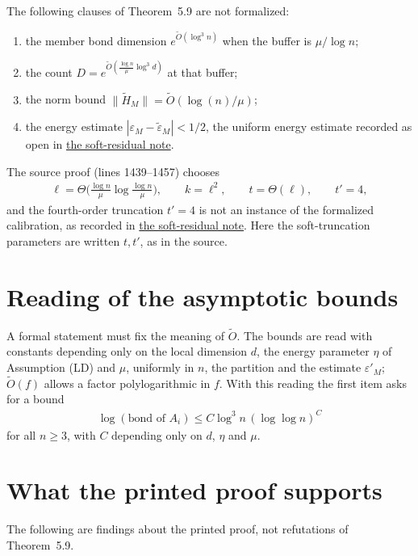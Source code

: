 \documentclass{article}
\begin{document}
The following clauses of Theorem~5.9 are not formalized:
\begin{enumerate}
 \item the member bond dimension $e^{\tilde O(\log^3 n)}$ when the buffer is
  $\mu/\log n$;
 \item the count $D=e^{\tilde O(\frac{\log n}{\mu}\log^3 d)}$ at that buffer;
 \item the norm bound $\|\tilde H_M\|=\tilde O(\log(n)/\mu)$;
 \item the energy estimate $|\varepsilon_M-\tilde\varepsilon_M|<1/2$, the
  uniform energy estimate recorded as open in
  \href{https://sirui-lu.com/TNLean/paper-gaps/alvv16_soft_regional_residuals.pdf}{the soft-residual note}.
\end{enumerate}
The source proof (lines 1439--1457) chooses
\begin{align}
 \ell=\Theta\Big(\frac{\log n}{\mu}\log\frac{\log n}{\mu}\Big),\qquad
 k=\ell^2,\qquad t=\Theta(\ell),\qquad t'=4,
 \label{eq:alvv16_eld_agsp_parameters}
\end{align}
and the fourth-order truncation $t'=4$ is not an instance of the formalized
calibration, as recorded in
\href{https://sirui-lu.com/TNLean/paper-gaps/alvv16_soft_regional_residuals.pdf}{the soft-residual note}. Here the soft-truncation
parameters are written $t,t'$, as in the source.

\section{Reading of the asymptotic bounds}

A formal statement must fix the meaning of $\tilde O$. The bounds are read with
constants depending only on the local dimension $d$, the energy parameter $\eta$
of Assumption (LD) and $\mu$, uniformly in $n$, the partition and the estimate
$\varepsilon'_M$; $\tilde O(f)$ allows a factor polylogarithmic in $f$. With
this reading the first item asks for a bound
\begin{align}
 \log(\text{bond of }A_i)\leq C\log^3 n\,(\log\log n)^{C}
 \label{eq:alvv16_eld_agsp_bond}
\end{align}
for all $n\geq3$, with $C$ depending only on $d$, $\eta$ and $\mu$.

\section{What the printed proof supports}

The following are findings about the printed proof, not refutations of
Theorem~5.9.
\end{document}
